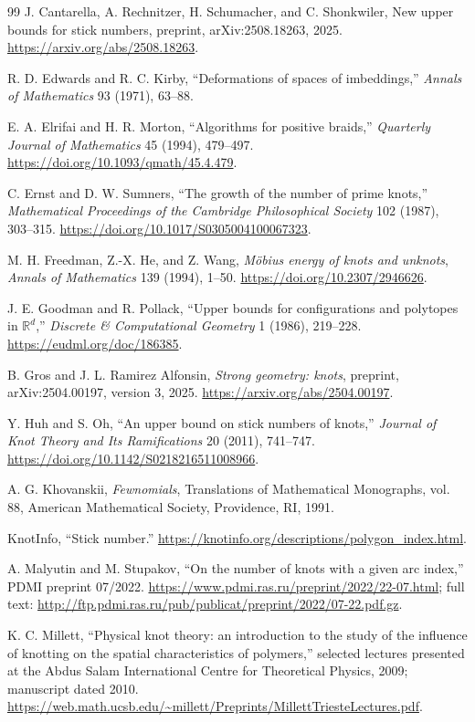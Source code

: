 \documentclass[11pt]{article}
\theoremstyle{remark}
\theoremstyle{plain}
\newcommand{\R}{\mathbb{R}}
\begin{document}
\begin{thebibliography}{99}
J. Cantarella, A. Rechnitzer, H. Schumacher, and C. Shonkwiler,
New upper bounds for stick numbers,
preprint, arXiv:2508.18263, 2025.
\url{https://arxiv.org/abs/2508.18263}.

R. D. Edwards and R. C. Kirby,
``Deformations of spaces of imbeddings,''
\emph{Annals of Mathematics} 93 (1971), 63--88.

E. A. Elrifai and H. R. Morton,
``Algorithms for positive braids,''
\emph{Quarterly Journal of Mathematics} 45 (1994), 479--497.
\url{https://doi.org/10.1093/qmath/45.4.479}.

C. Ernst and D. W. Sumners,
``The growth of the number of prime knots,''
\emph{Mathematical Proceedings of the Cambridge Philosophical Society} 102
(1987), 303--315.
\url{https://doi.org/10.1017/S0305004100067323}.

M. H. Freedman, Z.-X. He, and Z. Wang,
\emph{M\"obius energy of knots and unknots},
\emph{Annals of Mathematics} 139 (1994), 1--50.
\url{https://doi.org/10.2307/2946626}.

J. E. Goodman and R. Pollack,
``Upper bounds for configurations and polytopes in \(\R^d\),''
\emph{Discrete \& Computational Geometry} 1 (1986), 219--228.
\url{https://eudml.org/doc/186385}.

B. Gros and J. L. Ramirez Alfonsin,
\emph{Strong geometry: knots},
preprint, arXiv:2504.00197, version 3, 2025.
\url{https://arxiv.org/abs/2504.00197}.

Y. Huh and S. Oh,
``An upper bound on stick numbers of knots,''
\emph{Journal of Knot Theory and Its Ramifications} 20 (2011), 741--747.
\url{https://doi.org/10.1142/S0218216511008966}.

A. G. Khovanskii,
\emph{Fewnomials},
Translations of Mathematical Monographs, vol. 88,
American Mathematical Society, Providence, RI, 1991.

KnotInfo,
``Stick number.''
\url{https://knotinfo.org/descriptions/polygon_index.html}.

A. Malyutin and M. Stupakov,
``On the number of knots with a given arc index,''
PDMI preprint 07/2022.
\url{https://www.pdmi.ras.ru/preprint/2022/22-07.html}; full text:
\url{http://ftp.pdmi.ras.ru/pub/publicat/preprint/2022/07-22.pdf.gz}.

K. C. Millett,
``Physical knot theory: an introduction to the study of the influence of
knotting on the spatial characteristics of polymers,''
selected lectures presented at the Abdus Salam International Centre for
Theoretical Physics, 2009; manuscript dated 2010.
\url{https://web.math.ucsb.edu/~millett/Preprints/MillettTriesteLectures.pdf}.


\end{thebibliography}
\end{document}
